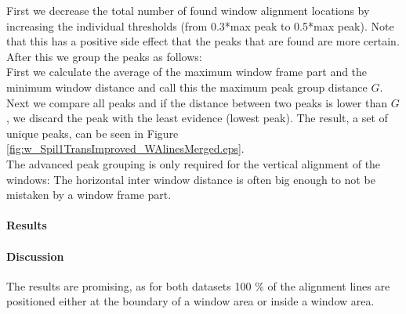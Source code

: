 First we decrease the total number of found window alignment locations by increasing the individual thresholds (from 0.3*max
peak to 0.5*max peak). Note that this has a positive side effect that the peaks that are found are more certain.
After this we group the peaks as follows: \\
First we calculate the average of the maximum window frame part and the minimum window
distance and call this the maximum peak group distance $G$.
Next we compare all peaks and if the distance between two peaks is lower than
$G$, we discard the peak with the least evidence (lowest peak). The result,
a set of unique peaks, can be seen in Figure \ref{fig:w_Spil1TransImproved_WAlinesMerged.eps}.\\

The advanced peak grouping is only required for the vertical alignment
of the windows: The horizontal inter window distance is often big enough to not
be mistaken by a window frame part.


\newpage
\paragraph{Results}


\clearpage

\paragraph{Discussion}
The results are promising, as for both datasets 100 \% of the alignment lines
are positioned either at the boundary of a window area or inside a window area.

